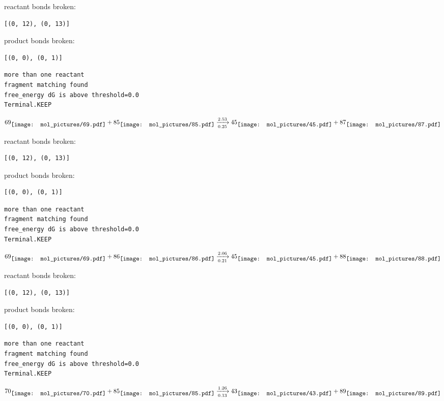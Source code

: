 \documentclass{article}
\begin{document}
reactant bonds broken:\begin{verbatim}
[(0, 12), (0, 13)]
\end{verbatim}
product bonds broken:\begin{verbatim}
[(0, 0), (0, 1)]
\end{verbatim}




\vspace{1cm}
\begin{verbatim}
more than one reactant
fragment matching found
free_energy dG is above threshold=0.0
Terminal.KEEP
\end{verbatim}
$$
69
\raisebox{-.5\height}{\texttt{[image: mol\_pictures/69.pdf]}}
+
85
\raisebox{-.5\height}{\texttt{[image: mol\_pictures/85.pdf]}}
\xrightarrow[0.25]{2.53}
45
\raisebox{-.5\height}{\texttt{[image: mol\_pictures/45.pdf]}}
+
87
\raisebox{-.5\height}{\texttt{[image: mol\_pictures/87.pdf]}}
$$


reactant bonds broken:\begin{verbatim}
[(0, 12), (0, 13)]
\end{verbatim}
product bonds broken:\begin{verbatim}
[(0, 0), (0, 1)]
\end{verbatim}




\vspace{1cm}
\begin{verbatim}
more than one reactant
fragment matching found
free_energy dG is above threshold=0.0
Terminal.KEEP
\end{verbatim}
$$
69
\raisebox{-.5\height}{\texttt{[image: mol\_pictures/69.pdf]}}
+
86
\raisebox{-.5\height}{\texttt{[image: mol\_pictures/86.pdf]}}
\xrightarrow[0.21]{2.06}
45
\raisebox{-.5\height}{\texttt{[image: mol\_pictures/45.pdf]}}
+
88
\raisebox{-.5\height}{\texttt{[image: mol\_pictures/88.pdf]}}
$$


reactant bonds broken:\begin{verbatim}
[(0, 12), (0, 13)]
\end{verbatim}
product bonds broken:\begin{verbatim}
[(0, 0), (0, 1)]
\end{verbatim}




\vspace{1cm}
\begin{verbatim}
more than one reactant
fragment matching found
free_energy dG is above threshold=0.0
Terminal.KEEP
\end{verbatim}
$$
70
\raisebox{-.5\height}{\texttt{[image: mol\_pictures/70.pdf]}}
+
85
\raisebox{-.5\height}{\texttt{[image: mol\_pictures/85.pdf]}}
\xrightarrow[0.13]{1.26}
43
\raisebox{-.5\height}{\texttt{[image: mol\_pictures/43.pdf]}}
+
89
\raisebox{-.5\height}{\texttt{[image: mol\_pictures/89.pdf]}}
$$
\end{document}
